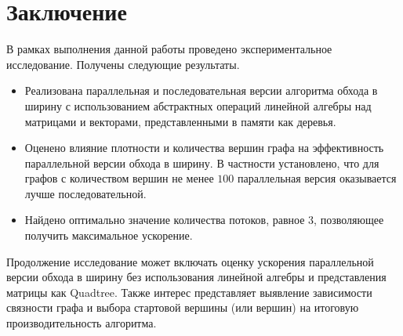 
\section*{Заключение}
В рамках выполнения данной работы проведено экспериментальное исследование. Получены следующие результаты.
\begin{itemize}
    \item Реализована параллельная и последовательная версии алгоритма обхода в ширину с использованием абстрактных операций линейной алгебры над матрицами и векторами, представленными в памяти как деревья.
    \item Оценено влияние плотности и количества вершин графа на эффективность параллельной версии обхода в ширину. В частности установлено, что для графов с количеством вершин не менее $100$ параллельная версия оказывается лучше последовательной.
    \item Найдено оптимально значение количества потоков, равное $3$, позволяющее получить максимальное ускорение.
\end{itemize}

Продолжение исследование может включать оценку ускорения параллельной версии обхода в ширину без использования линейной алгебры и представления матрицы как Quadtree.
Также интерес представляет выявление зависимости связности графа и выбора стартовой вершины (или вершин) на итоговую производительность алгоритма.